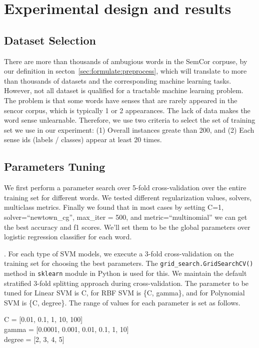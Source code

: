 \section{Experimental design and results}

\subsection{Dataset Selection}
\label{sec:results:data}

There are more than thousands of ambugious words in the SemCor corpuse, by our
definition in secton~\ref{sec:formulate:preprocess}, which will translate to
more than thousands of datasets and the corresponding machine learning tasks.
However, not all dataset is qualified for a tractable machine learning problem. 
The problem is that some words have senses that are rarely appeared in the
sencor corpus, which is typically 1 or 2 appearances.
The lack of data makes the word sense unlearnable.
Therefore, we use two criteria to select the set of training set we use in our
experiment:
(1) Overall instances greate than 200, 
and (2) Each sense ids (labels / classes) appear at least 20 times.

\subsection{Parameters Tuning}

We first perform a parameter search over 5-fold cross-validation over the entire
training set for different words. We tested different regularization values,
solvers, multiclass metrics. Finally we found that in most cases by setting C=1,
solver=``newtown\_cg'', max\_iter = 500, and metric=``multinomial'' we can get
the best accuracy and f1 scores. We'll set them to be the global parameters over
logistic regression classifier for each word. 

.
For each type of SVM models, we execute a 3-fold cross-validation on the
training set for choosing the best parameters. The
\texttt{grid\_search.GridSearchCV()} method in \texttt{sklearn} module in Python
is used for this. We maintain the default stratified 3-fold splitting approach
during cross-validation. The parameter to be tuned for Linear SVM is C, for RBF
SVM is \{C, gamma\}, and for Polynomial SVM is \{C, degree\}. The range of
values for each parameter is set as follows.

C = [0.01, 0.1, 1, 10, 100] \\
gamma = [0.0001, 0.001, 0.01, 0.1, 1, 10] \\
degree = [2, 3, 4, 5]

